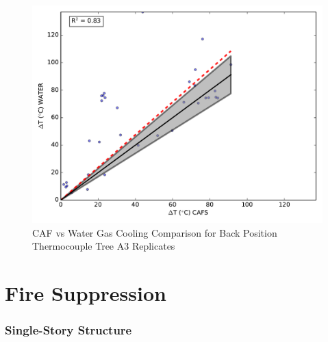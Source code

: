 \documentclass[12pt,oneside]{book}
\begin{document}
\begin{figure}[!ht]
	\includegraphics[width=.7\columnwidth]{../Figures/Gas_Cooling/Combined_fullback_A3_scatter}
	\caption{CAF vs Water Gas Cooling Comparison for Back Position Thermocouple Tree A3 Replicates}
	\label{fig:CAFS_Water_A3_back}
\end{figure}


\clearpage

\section{Fire Suppression}
\label{sec:Fire_Suppression}

\subsubsection*{Single-Story Structure}
\label{sec:fire_supp_single}
\end{document}
